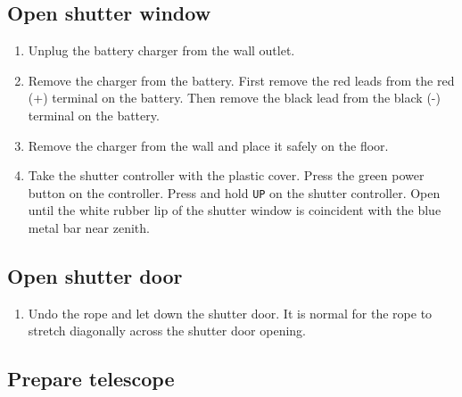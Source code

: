 \documentclass{article}
\begin{document}
	\subsection{Open shutter window}
	\label{sec:open-shutter-window}
	
	\begin{enumerate}
		
		\item Unplug the battery charger from the wall outlet.
		
		\item Remove the charger from the battery. First remove the red leads from the red (+) terminal on the battery. Then remove the black lead from the black (-) terminal on the battery.
		
		\item Remove the charger from the wall and place it safely on the floor.
		
		\item Take the shutter controller with the plastic cover. Press the green power button on the controller. Press and hold \texttt{UP} on the shutter controller. Open until the white rubber lip of the shutter window is coincident with the blue metal bar near zenith.
		
	\end{enumerate}
	
	\subsection{Open shutter door}
	\label{sec:open-shutter-door}
	
	\begin{enumerate}
		
		\item Undo the rope and let down the shutter door. It is normal for the rope to stretch diagonally across the shutter door opening.
		
	\end{enumerate}
	
	\subsection{Prepare telescope}
	\label{sec:prepare-telescope}
	
\end{document}
